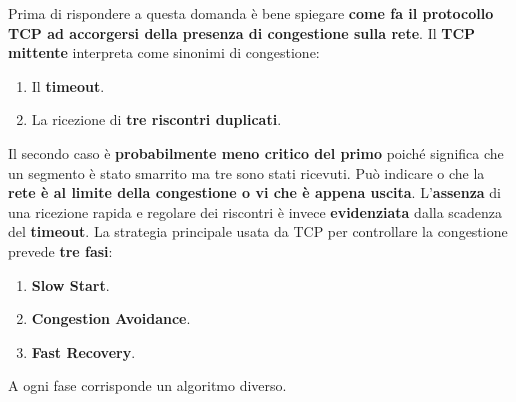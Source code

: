 \documentclass[11pt,a4paper]{article}
\theoremstyle{definition}
\begin{document}
Prima di rispondere a questa domanda è bene spiegare \textbf{come fa il protocollo TCP ad accorgersi della presenza di congestione sulla rete}.
Il \textbf{TCP mittente} interpreta come sinonimi di congestione:
\begin{enumerate}
	\item Il \textbf{timeout}.
	\item La ricezione di \textbf{tre riscontri duplicati}.
\end{enumerate}
Il secondo caso è \textbf{probabilmente meno critico del primo} poiché significa che un segmento è stato smarrito ma tre sono stati ricevuti. Può indicare o che la \textbf{rete è al limite della congestione o vi che è appena uscita}. L'\textbf{assenza} di una ricezione rapida e regolare dei riscontri è invece \textbf{evidenziata} dalla scadenza del \textbf{timeout}.
\newpage
La strategia principale usata da TCP per controllare la congestione prevede \textbf{tre fasi}:
\begin{enumerate}
	\item \textbf{Slow Start}.
	\item \textbf{Congestion Avoidance}.
	\item \textbf{Fast Recovery}.
\end{enumerate}
A ogni fase corrisponde un algoritmo diverso.
\end{document}
